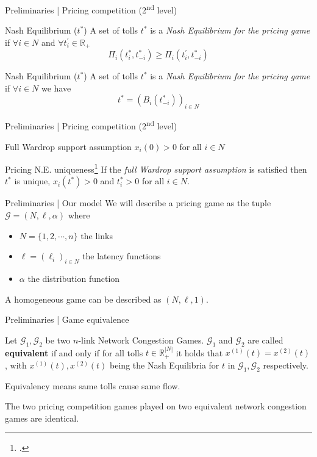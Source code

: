 \documentclass{beamer}
\newcommand{\R}{\mathbb{R}}
\newcommand{\Gm}{\mathcal{G}}
\begin{document}
\begin{frame}{Preliminaries | Pricing competition (2\textsuperscript{nd} level)}
	\begin{block}{Nash Equilibrium ($t^*$)}
		A set of tolls $t^*$ is a \textit{Nash Equilibrium for the pricing game} if $\forall i \in N$ and $\forall t_i^\prime \in \R_+$
		\[\Pi_i(t_i^*, t_{-i}^*) \geq \Pi_i(t_i^\prime, t_{-i}^*)\]
	\end{block}
	\begin{block}{Nash Equilibrium ($t^*$)}
		A set of tolls $t^*$ is a \textit{Nash Equilibrium for the pricing game} if
		$\forall i \in N$ we have
		\[t^* = (B_i(t_{-i}^*))_{i \in N}\]
	\end{block}
\end{frame}

\begin{frame}{Preliminaries | Pricing competition (2\textsuperscript{nd} level)}
	\begin{block}{Full Wardrop support assumption}
		$x_i(0) > 0$ for all $i \in N$
	\end{block}
	\begin{block}{Pricing N.E. uniqueness\footcite{Harks_2019}}
		If the \textit{full Wardrop support assumption} is satisfied then $t^*$ is unique, $x_i(t^*) > 0$ and $t_i^* > 0$ for all $i \in N$.
	\end{block}
\end{frame}

\begin{frame}{Preliminaries | Our model}
	We will describe a pricing game as the tuple $\Gm = (N, \ell, \alpha)$ where
	\begin{itemize}
		\item $N = \{1, 2, \cdots, n\}$ the links
		\item $\ell = (\ell_i)_{i \in N}$ the latency functions
		\item $\alpha$ the distribution function
	\end{itemize}\pause
	A homogeneous game can be described as $(N, \ell, 1)$.
\end{frame}

\begin{frame}{Preliminaries | Game equivalence}
	\begin{definition}
		Let $\Gm_1, \Gm_2$ be two $n$-link Network Congestion Games.
		$\Gm_1$ and $\Gm_2$ are called \textbf{equivalent} if and only if for all tolls $t \in \R_+^{|N|}$ it holds that $x^{(1)}(t) = x^{(2)}(t)$, with $x^{(1)}(t), x^{(2)}(t)$ being the Nash Equilibria for $t$ in $\Gm_1, \Gm_2$ respectively.
	\end{definition}
	Equivalency means same tolls cause same flow.\pause

	The two pricing competition games played on two equivalent network congestion games are identical.
\end{frame}
\end{document}
